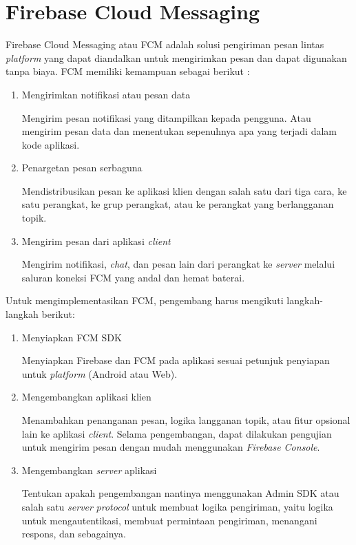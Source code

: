 \section{Firebase Cloud Messaging}
\par Firebase Cloud Messaging atau FCM adalah solusi pengiriman pesan lintas \textit{platform} yang dapat diandalkan untuk mengirimkan pesan dan dapat digunakan tanpa biaya. FCM memiliki kemampuan sebagai berikut \cite{fcm-online}:
\begin{enumerate}[listparindent=2.5em]
	\item Mengirimkan notifikasi atau pesan data
	\par Mengirim pesan notifikasi yang ditampilkan kepada pengguna. Atau mengirim pesan data dan menentukan sepenuhnya apa yang terjadi dalam kode aplikasi.
	\item Penargetan pesan serbaguna
	\par Mendistribusikan pesan ke aplikasi klien dengan salah satu dari tiga cara, ke satu perangkat, ke grup perangkat, atau ke perangkat yang berlangganan topik.
	\item Mengirim pesan dari aplikasi \textit{client}
	\par Mengirim notifikasi, \textit{chat}, dan pesan lain dari perangkat ke \textit{server} melalui saluran koneksi FCM yang andal dan hemat baterai.
\end{enumerate}
\par Untuk mengimplementasikan FCM, pengembang harus mengikuti langkah-langkah berikut:
\begin{enumerate}[listparindent=2.5em]
	\item Menyiapkan FCM SDK
	\par Menyiapkan Firebase dan FCM pada aplikasi sesuai petunjuk penyiapan untuk \textit{platform} (Android atau Web).
	\item Mengembangkan aplikasi klien
	\par Menambahkan penanganan pesan, logika langganan topik, atau fitur opsional lain ke aplikasi \textit{client}. Selama pengembangan, dapat dilakukan pengujian untuk mengirim pesan dengan mudah menggunakan \textit{Firebase Console}.
	\item Mengembangkan \textit{server} aplikasi
	\par Tentukan apakah pengembangan nantinya menggunakan Admin SDK atau salah satu \textit{server} \textit{protocol} untuk membuat logika pengiriman, yaitu logika untuk mengautentikasi, membuat permintaan pengiriman, menangani respons, dan sebagainya.
\end{enumerate}
